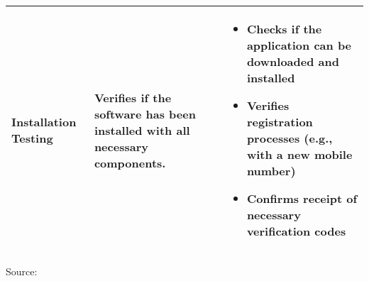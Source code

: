 \begin{longtable}{@{}p{3cm}p{6cm}p{5cm}@{}}
    Installation Testing & Verifies if the software has been installed with all necessary components. &  
    \begin{itemize}[leftmargin=*,nosep,after=\vspace{-\baselineskip}]
        \item Checks if the application can be downloaded and installed
        \item Verifies registration processes (e.g., with a new mobile number)
        \item Confirms receipt of necessary verification codes
    \end{itemize} \\
    \midrule
\end{longtable}
\centering 
\footnotesize Source: \cite{khan2011different, meenakshi2014software}